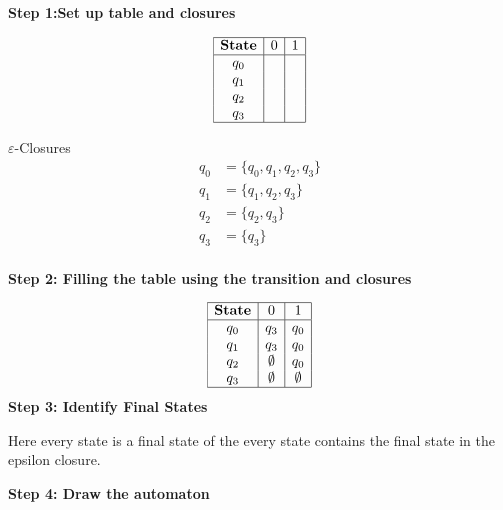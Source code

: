 \textbf{Step 1:Set up table and closures}

\[
    \begin{array}{|c|c|c|}
    \hline
    \textbf{State} & 0              & 1    \\
    \hline
    q_0            &  &   \\
    q_1   &  &   \\
    q_2   &  &   \\
    q_3   &  &   \\
    \hline
    \end{array}
\]

\(\varepsilon\)-Closures
\begin{align*}
    q_0 &= \{q_0, q_1, q_2, q_3\} \\
    q_1 &= \{q_1, q_2, q_3\} \\
    q_2 &= \{q_2, q_3\} \\
    q_3 &= \{q_3\} \\
\end{align*}


\textbf{Step 2: Filling the table using the transition and closures}

\[
    \begin{array}{|c|c|c|}
    \hline
    \textbf{State} & 0              & 1    \\
    \hline
    q_0   & q_3 & q_0  \\
    q_1   & q_3 & q_0  \\
    q_2   & \emptyset & q_0  \\
    q_3   &  \emptyset & \emptyset   \\
    \hline
    \end{array}
\]
\textbf{Step 3: Identify Final States}

Here every state is a final state of the every state contains the final state in the epsilon closure.

\textbf{Step 4: Draw the automaton}

\begin{center}
\end{center}

